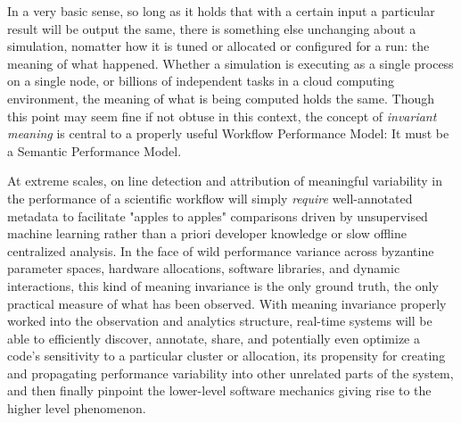 In a very basic sense, so long as it holds that with a certain input a
particular result will be output the same, there is something else
unchanging about a simulation, nomatter how it is tuned or allocated
or configured for a run: the meaning of what happened.
%
Whether a simulation is executing as a single process on a single
node, or billions of independent tasks in a cloud computing
environment, the meaning of what is being computed holds the
same.
%
Though this point may seem fine if not obtuse in this context, the
concept of \textit{invariant meaning} is central to a properly useful
Workflow Performance Model: It must be a Semantic Performance Model.

At extreme scales, on line detection and attribution of meaningful
variability in the performance of a scientific workflow will simply
\textit{require} well-annotated metadata to facilitate "apples to
apples" comparisons driven by unsupervised machine learning rather
than a priori developer knowledge or slow offline centralized
analysis.
%
In the face of wild performance variance across byzantine parameter
spaces, hardware allocations, software libraries, and dynamic
interactions, this kind of meaning invariance is the only ground
truth, the only practical measure of what has been observed.
%
With meaning invariance properly worked into the observation and
analytics structure, real-time systems will be able to efficiently
discover, annotate, share, and potentially even optimize a code's
sensitivity to a particular cluster or allocation, its propensity for
creating and propagating performance variability into other unrelated
parts of the system, and then finally pinpoint the lower-level
software mechanics giving rise to the higher level phenomenon.


